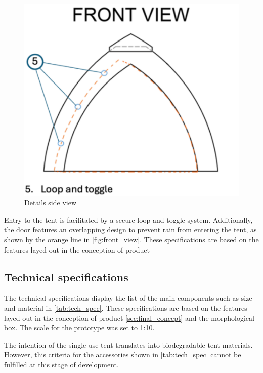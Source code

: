 \documentclass{article}
\begin{document}
\newpage
\begin{figure}[ht!]
    \centering
    \includegraphics[width=.35\textwidth]{media/front_view.png}
    \caption{Details side view}
    \label{fig:front_view}
\end{figure}

Entry to the tent is facilitated by a secure loop-and-toggle system. Additionally, the door
features an overlapping design to prevent rain from entering the tent, as shown by the orange
line in \autoref{fig:front_view}. These specifications are based on the features layed out in the conception of
product 

\subsection{Technical specifications}
The technical specifications display the list of the main components such as size and material
in \autoref{tab:tech_spec}. These specifications are based on the features layed out in the conception of
product \autoref{sec:final_concept} and the morphological box. The scale for the prototype was set to 1:10.

The intention of the single use tent translates into biodegradable tent materials. However,
this criteria for the accessories shown in \autoref{tab:tech_spec} cannot be fulfilled at this stage of
development.
\end{document}
